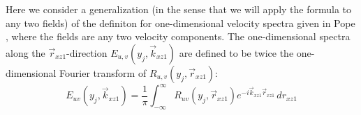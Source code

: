 \documentclass[letterpaper,11pt,nointlimits,reqno]{amsart}
\begin{document}
Here we consider a generalization (in the sense that we will apply the formula
to any two fields) of the definiton for one-dimensional velocity spectra given
in Pope \citep[\textsection{}6.3]{Pope2000Turbulent}, where the fields are any
two velocity components.  The one-dimensional spectra along the
$\vec{r}_{xz1}$-direction  $E_{u,v}(y_j,\vec{k}_{xz1})$ are defined to be twice
the one-dimensional Fourier transform of $R_{u,v}(y_j,\vec{r}_{xz1})$:
%
\begin{equation}
E_{uv}(y_j,\vec{k}_{xz1}) = \frac{1}{\pi} \int_{-\infty}^{\infty}
                           R_{uv}(y_j,\vec{r}_{xz1})
                           e^{-i \vec{k}_{xz1} \vec{r}_{xz1}} \,d\!r_{xz1}
\end{equation}
%

\newcommand*{\doi}[1]{\href{http://dx.doi.org/\detokenize{#1}}{doi: #1}}


\end{document}
